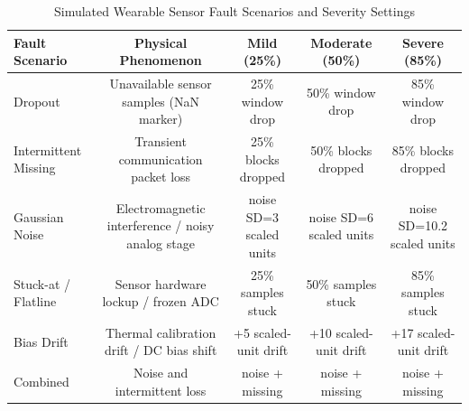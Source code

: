 \begin{table}[htbp]
\caption{Simulated Wearable Sensor Fault Scenarios and Severity Settings}
\label{tab:fault_definitions}
\centering
\begin{tabular}{lcccc}
\hline
Fault Scenario & Physical Phenomenon & Mild (25\%) & Moderate (50\%) & Severe (85\%) \\ \hline
Dropout & Unavailable sensor samples (NaN marker) & 25\% window drop & 50\% window drop & 85\% window drop \\
Intermittent Missing & Transient communication packet loss & 25\% blocks dropped & 50\% blocks dropped & 85\% blocks dropped \\
Gaussian Noise & Electromagnetic interference / noisy analog stage & noise SD=3 scaled units & noise SD=6 scaled units & noise SD=10.2 scaled units \\
Stuck-at / Flatline & Sensor hardware lockup / frozen ADC & 25\% samples stuck & 50\% samples stuck & 85\% samples stuck \\
Bias Drift & Thermal calibration drift / DC bias shift & +5 scaled-unit drift & +10 scaled-unit drift & +17 scaled-unit drift \\
Combined & Noise and intermittent loss & noise + missing & noise + missing & noise + missing \\
\hline
\end{tabular}
\end{table}
